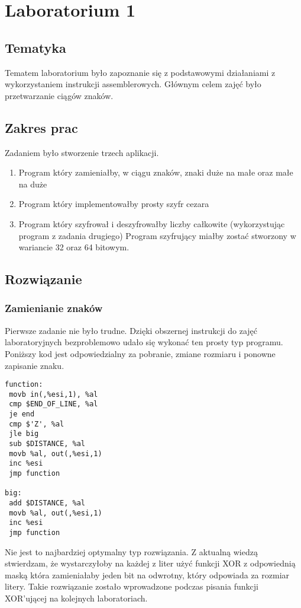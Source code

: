 \chapter{Laboratorium 1}
\section{Tematyka}
Tematem laboratorium było zapoznanie się z podstawowymi działaniami z wykorzystaniem
instrukcji assemblerowych. Głównym celem zajęć było przetwarzanie ciągów znaków.
\section{Zakres prac}
Zadaniem było stworzenie trzech aplikacji.
\begin{enumerate}
	\item Program który zamieniałby, w ciągu znaków, znaki duże na małe oraz małe na duże
	\item Program który implementowałby prosty szyfr cezara
	\item Program który szyfrował i deszyfrowałby liczby całkowite (wykorzystując program z zadania drugiego)
Program szyfrujący miałby zostać stworzony w wariancie 32 oraz 64 bitowym.
\end{enumerate}
\section{Rozwiązanie}
\subsection{Zamienianie znaków}
Pierwsze zadanie nie było trudne. Dzięki obszernej instrukcji do zajęć laboratoryjnych bezproblemowo udało się wykonać ten prosty typ programu. Poniższy kod jest odpowiedzialny za pobranie, zmiane rozmiaru i ponowne zapisanie znaku.
\begin{lstlisting}[frame=single, basicstyle=\small, caption=Funkcja zmieniająca rozmiar znaków]
function:
 movb in(,%esi,1), %al
 cmp $END_OF_LINE, %al
 je end
 cmp $'Z', %al
 jle big
 sub $DISTANCE, %al
 movb %al, out(,%esi,1)
 inc %esi
 jmp function

big:
 add $DISTANCE, %al
 movb %al, out(,%esi,1)
 inc %esi
 jmp function
\end{lstlisting}
Nie jest to najbardziej optymalny typ rozwiązania. Z aktualną wiedzą stwierdzam, że wystarczyłoby na każdej z liter użyć funkcji XOR z odpowiednią maską która zamieniałaby jeden bit na odwrotny, który odpowiada za rozmiar litery. Takie rozwiązanie zostało wprowadzone podczas pisania funkcji XOR'ującej na kolejnych laboratoriach.
